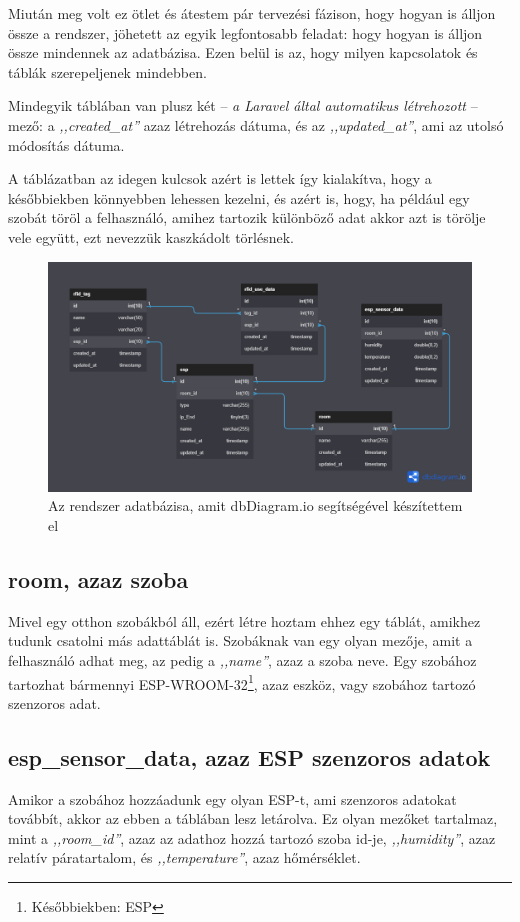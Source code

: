 \documentclass[
]{thesis-ekf}
\theoremstyle{definition}
\theoremstyle{remark}
\begin{document}
	Miután meg volt ez ötlet és átestem pár tervezési fázison, hogy hogyan is álljon össze a rendszer, jöhetett az egyik legfontosabb feladat: hogy hogyan is álljon össze mindennek az adatbázisa. Ezen belül is az, hogy milyen kapcsolatok és táblák szerepeljenek mindebben.
	
	Mindegyik táblában van plusz két -- \emph{a Laravel által automatikus létrehozott} -- mező: a \emph{,,created\_at''} azaz létrehozás dátuma, és az \emph{,,updated\_at''}, ami az utolsó módosítás dátuma.
	
	A táblázatban az idegen kulcsok azért is lettek így kialakítva, hogy a későbbiekben könnyebben lehessen kezelni, és azért is, hogy, ha például egy szobát töröl a felhasználó, amihez tartozik különböző adat akkor azt is törölje vele együtt, ezt nevezzük kaszkádolt törlésnek.
	\begin{figure}[ht!]
		\centering
		\includegraphics[width=1\textwidth]{./src/database}
		\caption{Az rendszer adatbázisa, amit dbDiagram.io segítségével készítettem el}
		\label{database-fig}
	\end{figure}	

	\subsection*{room, azaz szoba}
	Mivel egy otthon szobákból áll, ezért létre hoztam ehhez egy táblát, amikhez tudunk csatolni más adattáblát is. Szobáknak van egy olyan mezője, amit a felhasználó adhat meg, az pedig a \emph{,,name''}, azaz a szoba neve. Egy szobához tartozhat bármennyi ESP-WROOM-32\footnote{Későbbiekben: ESP}, azaz eszköz, vagy szobához tartozó szenzoros adat.
	
	\subsection*{esp\_sensor\_data, azaz ESP szenzoros adatok}
	Amikor a szobához hozzáadunk egy olyan ESP-t, ami szenzoros adatokat továbbít, akkor az ebben a táblában lesz letárolva. Ez olyan mezőket tartalmaz, mint a \emph{,,room\_id''}, azaz az adathoz hozzá tartozó szoba id-je, \emph{,,humidity''}, azaz relatív páratartalom, és \emph{,,temperature''}, azaz hőmérséklet.
	
\end{document}
